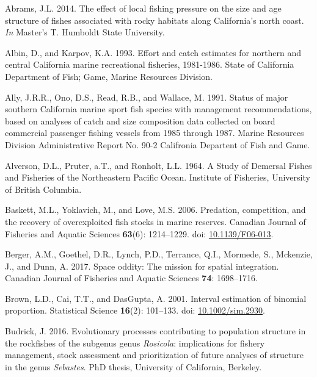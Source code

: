 \documentclass[
  english,
  a4paper,
]{article}
\newlength{\cslhangindent}
\newlength{\cslentryspacingunit} %
\newenvironment{CSLReferences}[2] %
 {%
  \setlength{\parindent}{0pt}
  \ifodd #1
  \let\oldpar\par
  \def\par{\hangindent=\cslhangindent\oldpar}
  \fi
  \setlength{\parskip}{#2\cslentryspacingunit}
 }%
 {}
\begin{document}
\hypertarget{refs}{}
\begin{CSLReferences}{1}{0}
\leavevmode{}%
Abrams, J.L. 2014. {The effect of local fishing pressure on the size and age structure of fishes associated with rocky habitats along California's north coast}. \emph{In} Master's T. Humboldt State University.

\leavevmode{}%
Albin, D., and Karpov, K.A. 1993. {Effort and catch estimates for northern and central California marine recreational fisheries, 1981-1986}. State of California Department of Fish; Game, Marine Resources Division.

\leavevmode{}%
Ally, J.R.R., Ono, D.S., Read, R.B., and Wallace, M. 1991. {Status of major southern California marine sport fish species with management recommendations, based on analyses of catch and size composition data collected on board commercial passenger fishing vessels from 1985 through 1987}. Marine Resources Division Administrative Report No. 90-2 Califronia Departent of Fish and Game.

\leavevmode{}%
Alverson, D.L., Pruter, a.T., and Ronholt, L.L. 1964. {A Study of Demersal Fishes and Fisheries of the Northeastern Pacific Ocean}. Institute of Fisheries, University of British Columbia.

\leavevmode{}%
Baskett, M.L., Yoklavich, M., and Love, M.S. 2006. {Predation, competition, and the recovery of overexploited fish stocks in marine reserves}. Canadian Journal of Fisheries and Aquatic Sciences \textbf{63}(6): 1214--1229. doi: \href{https://doi.org/10.1139/F06-013}{10.1139/F06-013}.

\leavevmode{}%
Berger, A.M., Goethel, D.R., Lynch, P.D., Terrance, Q.I., Mormede, S., Mckenzie, J., and Dunn, A. 2017. {Space oddity: The mission for spatial integration}. Canadian Journal of Fisheries and Aquatic Sciences \textbf{74}: 1698--1716.

\leavevmode{}%
Brown, L.D., Cai, T.T., and DasGupta, A. 2001. {Interval estimation of binomial proportion}. Statistical Science \textbf{16}(2): 101--133. doi: \href{https://doi.org/10.1002/sim.2930}{10.1002/sim.2930}.

\leavevmode{}%
Budrick, J. 2016. {Evolutionary processes contributing to population structure in the rockfishes of the subgenus genus \emph{Rosicola}: implications for fishery management, stock assessment and prioritization of future analyses of structure in the genus \emph{Sebastes}.} PhD thesis, University of California, Berkeley.


\end{CSLReferences}
\end{document}
